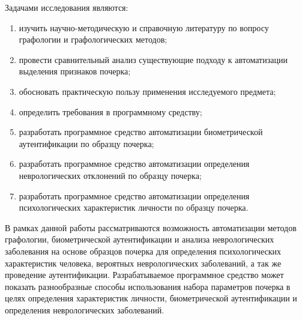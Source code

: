 Задачами исследования являются:
\begin{enumerate}
  \item изучить научно-методическую и справочную литературу по вопросу графологии и графологических методов;
  \item провести сравнительный анализ существующие подходу к автоматизации выделения признаков почерка;
  \item обосновать практическую пользу применения исследуемого \mbox{предмета};
  \item определить требования в программному средству;
  \item разработать программное средство автоматизации биометрической аутентификации по образцу почерка;
  \item разработать программное средство автоматизации определения неврологических отклонений по образцу почерка;
  \item разработать программное средство автоматизации определения психологических характеристик личности по образцу почерка.
\end{enumerate}

В рамках данной работы рассматриваются возможность автоматизации методов графологии, биометрической аутентификации и анализа неврологических заболевания на основе образцов почерка для определения психологических характеристик человека, вероятных неврологических заболеваний, а так же проведение аутентификации.
Разрабатываемое программное средство может показать разнообразные способы использования набора параметров почерка в целях определения характеристик личности, биометрической аутентификации и определения неврологических заболеваний.